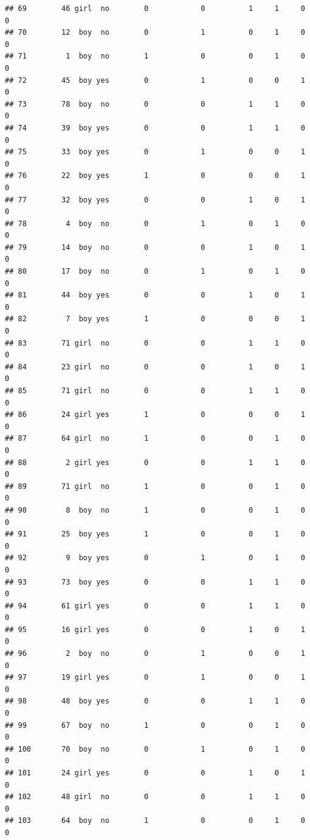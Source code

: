 \documentclass[man]{apa6}
\begin{document}
\begin{verbatim}
## 69        46 girl  no        0            0          1     1     0     0
## 70        12  boy  no        0            1          0     1     0     0
## 71         1  boy  no        1            0          0     1     0     0
## 72        45  boy yes        0            1          0     0     1     0
## 73        78  boy  no        0            0          1     1     0     0
## 74        39  boy yes        0            0          1     1     0     0
## 75        33  boy yes        0            1          0     0     1     0
## 76        22  boy yes        1            0          0     0     1     0
## 77        32  boy yes        0            0          1     0     1     0
## 78         4  boy  no        0            1          0     1     0     0
## 79        14  boy  no        0            0          1     0     1     0
## 80        17  boy  no        0            1          0     1     0     0
## 81        44  boy yes        0            0          1     0     1     0
## 82         7  boy yes        1            0          0     0     1     0
## 83        71 girl  no        0            0          1     1     0     0
## 84        23 girl  no        0            0          1     0     1     0
## 85        71 girl  no        0            0          1     1     0     0
## 86        24 girl yes        1            0          0     0     1     0
## 87        64 girl  no        1            0          0     1     0     0
## 88         2 girl yes        0            0          1     1     0     0
## 89        71 girl  no        1            0          0     1     0     0
## 90         8  boy  no        1            0          0     1     0     0
## 91        25  boy yes        1            0          0     1     0     0
## 92         9  boy yes        0            1          0     1     0     0
## 93        73  boy yes        0            0          1     1     0     0
## 94        61 girl yes        0            0          1     1     0     0
## 95        16 girl yes        0            0          1     0     1     0
## 96         2  boy  no        0            1          0     0     1     0
## 97        19 girl yes        0            1          0     0     1     0
## 98        48  boy yes        0            0          1     1     0     0
## 99        67  boy  no        1            0          0     1     0     0
## 100       70  boy  no        0            1          0     1     0     0
## 101       24 girl yes        0            0          1     0     1     0
## 102       48 girl  no        0            0          1     1     0     0
## 103       64  boy  no        1            0          0     1     0     0

\end{verbatim}
\end{document}
